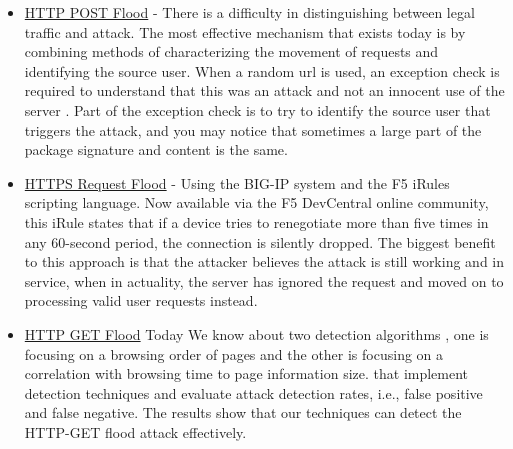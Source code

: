 \documentclass{report}
\begin{document}
\begin{itemize}
\item\underline {HTTP POST Flood} -  There is a difficulty in distinguishing between legal traffic and attack.
The most effective mechanism that exists today is by combining methods of characterizing the movement of requests and identifying the source user.
When a random url is used, an exception check is required to understand that this was an attack and not an innocent use of the server \cite{AppstSolution}. Part of the exception check is to try to identify the source user that triggers the attack, and you may notice that sometimes a large part of the package signature and content is the same.

\item\underline {HTTPS Request Flood} - Using the BIG-IP system \cite{HTTPSRequestSolution} and the F5 iRules scripting language.
Now available via the F5 DevCentral online community, this iRule states that if a device tries to renegotiate more than five times in any 60-second period, the connection is silently dropped.
The biggest benefit to this approach is that the attacker believes the attack is still working and in service, when in actuality, the server has ignored the request and moved on to processing valid user requests instead.


\item\underline {HTTP GET Flood} Today We know about two detection algorithms \cite{AppstSolution}, one is focusing on a browsing order of pages and the other is focusing on a correlation with browsing time to page information size. that implement detection techniques and evaluate attack detection rates, i.e., false positive and false negative. The results show that our techniques can detect the HTTP-GET flood attack effectively.
\end{itemize}
\end{document}
